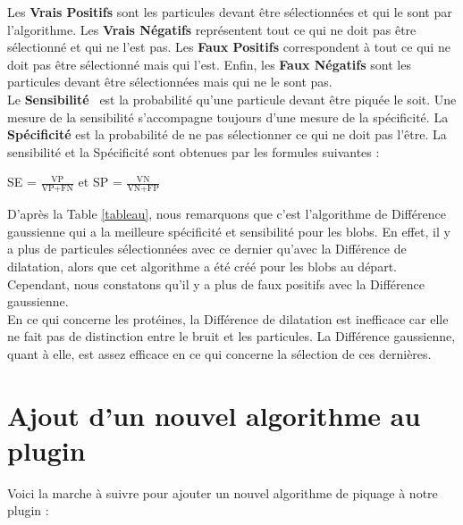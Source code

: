 Les \textbf{Vrais Positifs} sont les particules devant être sélectionnées et qui le sont par l'algorithme. Les \textbf{Vrais Négatifs} représentent tout ce qui ne doit pas être sélectionné et qui ne l'est pas. Les \textbf{Faux Positifs} correspondent à tout ce qui ne doit pas être sélectionné mais qui l'est. Enfin, les \textbf{Faux Négatifs} sont les particules devant être sélectionnées mais qui ne le sont pas. \\ 
Le \textbf{Sensibilité}~\cite{stats:url} est la probabilité qu'une particule devant être piquée le soit. Une mesure de la sensibilité s'accompagne toujours d'une mesure de la spécificité. La \textbf{Spécificité} est la probabilité de ne pas sélectionner ce qui ne doit pas l'être. La sensibilité et la Spécificité sont obtenues par les formules suivantes : \\

\begin{center}
SE = $\frac{\text{VP}}{\text{VP+FN}}$ et SP = $\frac{\text{VN}}{\text{VN+FP}}$ \\
\end{center}

D'après la Table \ref{tableau}, nous remarquons que c'est l'algorithme de Différence gaussienne qui a la meilleure spécificité et sensibilité pour les blobs. En effet, il y a plus de particules sélectionnées avec ce dernier qu'avec la Différence de dilatation, alors que cet algorithme a été créé pour les blobs au départ. Cependant, nous constatons qu'il y a plus de faux positifs avec la Différence gaussienne. \\
En ce qui concerne les protéines, la Différence de dilatation est inefficace car elle ne fait pas de distinction entre le bruit et les particules. La Différence gaussienne, quant à elle, est assez efficace en ce qui concerne la sélection de ces dernières. 

\section{Ajout d'un nouvel algorithme au plugin}

Voici la marche à suivre pour ajouter un nouvel algorithme de piquage à notre plugin :

